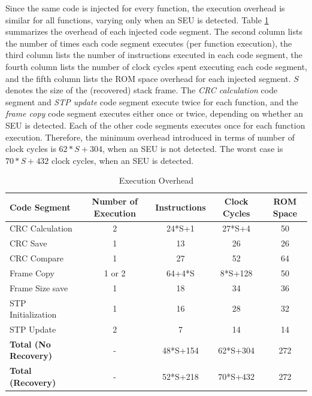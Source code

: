 Since the same code is injected for every function, the execution overhead is similar for all functions, varying only when an SEU is detected. Table \ref{tbl_speed_overhead} summarizes the overhead of each injected code segment. The second column lists the number of times each code segment executes (per function execution), the third column lists the number of instructions executed in each code segment, the fourth column lists the number of clock cycles spent executing each code segment, and the fifth column lists the ROM space overhead for each injected segment. $S$ denotes the size of the (recovered) stack frame. The \textit{CRC calculation} code segment and \textit{STP update} code segment execute twice for each function, and the \textit{frame copy} code segment executes either once or twice, depending on whether an SEU is detected. Each of the other code segments executes once for each function execution. Therefore, the minimum overhead introduced in terms of number of clock cycles is $62*S+304$, when an SEU is not detected. The worst case is $70*S+432$ clock cycles, when an SEU is detected. 
\begin{table}
	\center
    \begin{tabular}{|l|c|c|c|c|}
    \hline
   \textbf{Code Segment}   & \textbf{Number of Execution} & \textbf{Instructions} & \textbf{Clock Cycles} & \textbf{ROM Space}	\\ \hline
    CRC Calculation         & 2			& 24*S+1		& 27*S+4		& 50				\\ \hline
    CRC Save                & 1			& 13			& 26           	& 26				\\ \hline
    CRC Compare             & 1			& 27			& 52		   	& 64				\\ \hline
    Frame Copy				& 1 or 2	& 64+4*S		& 8*S+128      	& 50				\\ \hline
    Frame Size save         & 1			& 18			& 34           	& 36				\\ \hline
    STP Initialization		& 1			& 16			& 28		   	& 32				\\ \hline
	STP Update				& 2			& 7				& 14			& 14				\\ \hline
	\textbf{Total (No Recovery)} & -	 	& 48*S+154     	& 62*S+304		& 272  		\\ \hline
	\textbf{Total (Recovery)}& -	 		& 52*S+218     	& 70*S+432		& 272 		\\ \hline
    \end{tabular}
	\vspace{5pt}
    \caption {Execution Overhead}
    \label{tbl_speed_overhead}
\end{table}

